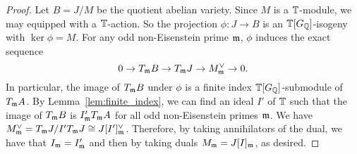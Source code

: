 \documentclass[thesis.tex]{subfiles}
\begin{document}
\begin{proof}
Let $B=J/M$ be the quotient abelian variety. Since $M$ is a $\mathbb{T}$-module,
we may equipped with a $\mathbb{T}$-action. So the projection $\phi:J \to B$ is an
$\mathbb{T}[G_{\mathbb{Q}}]$-isogeny with $\ker\phi = M$. For any odd non-Eisenstein prime
$\mathfrak{m}$, $\phi$ induces the exact sequence
\[
    0 \to T_{\mathfrak{m}} B \to T_{\mathfrak{m}} J \to M^\vee _{\mathfrak{m}} \to 0.
\]
In particular, the image of $T_{\mathfrak{m}} B$ under $\phi$ is a finite index
$\mathbb{T}[G_{\mathbb{Q}}]$-submodule of $T_{\mathfrak{m}} A$. By Lemma~\ref{lem:finite_index}, we can find
an ideal $I'$ of $\mathbb{T}$ such that the image of $T_{\mathfrak{m}} B$ is $I' _{\mathfrak{m}} T_{\mathfrak{m}} A$
for all odd non-Eisenstein primes $\mathfrak{m}$. We have $M^\vee _{\mathfrak{m}} = T_{\mathfrak{m}} J / I'
T_{\mathfrak{m}} J\cong J[I']_{\mathfrak{m}} ^\vee$. Therefore, by taking annihilators of the dual,
we have that $I_{\mathfrak{m}} = I'_{\mathfrak{m}}$ and then by taking duals $M_{\mathfrak{m}} = J[I]_{\mathfrak{m}}$, as
desired.

\end{proof}


\end{document}
